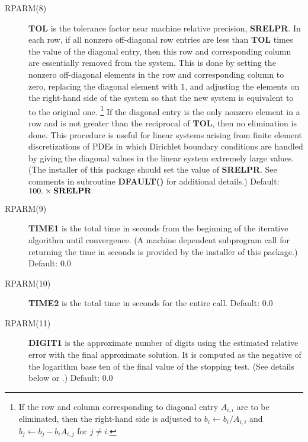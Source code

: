 \begin{description}
 \item[RPARM(8)] {\bf TOL} is the tolerance factor near machine relative 
                 precision, {\bf SRELPR}.  In each row, if all nonzero 
                 off-diagonal row entries are less than {\bf TOL} times 
                 the value of the diagonal entry, then this row and 
                 corresponding column are essentially removed from the 
                 system.  This is done by setting the nonzero off-diagonal 
                 elements in the row and corresponding column to zero, 
                 replacing the diagonal element with $1$, and adjusting 
                 the elements on the right-hand side of the system so that 
                 the new system is equivalent to to the original one.
                 \footnote{If the row and column corresponding to diagonal 
                 entry $A_{i,i}$ are to be eliminated, then the 
                 right-hand side is adjusted to $b_i \leftarrow b_i/A_{i,i}$ 
                 and $b_j \leftarrow b_j-b_i A_{i,j}$ for $j \neq i$.}  
                 If the diagonal entry is the only nonzero 
                 element in a row and is not greater than the reciprocal 
                 of {\bf TOL}, then no elimination is done.  This procedure 
                 is useful for linear systems arising from finite element 
                 discretizations of PDEs in which Dirichlet boundary 
                 conditions are handled by giving the diagonal values in 
                 the linear system extremely large values.  (The installer 
                 of this package should set the value of {\bf SRELPR}.
                 See comments in subroutine {\bf DFAULT()} for additional 
                 details.)  Default: $100.\times{\bf SRELPR}$
 
 \item[RPARM(9)] {\bf TIME1} is the total time in seconds from the beginning
                 of the iterative algorithm until convergence.  (A machine
                 dependent subprogram call for returning the time in
                 seconds is provided by the installer of this package.)
                 Default: $0.0$
 
 \item[RPARM(10)] {\bf TIME2} is the total time in seconds for the entire 
                  call.  Default: $0.0$
 
 \item[RPARM(11)] {\bf DIGIT1} is the approximate number of digits using 
                  the estimated relative error with the final approximate
                  solution.  It is computed as the negative of the logarithm
                  base ten of the final value of the stopping test.  (See
                  details below or \cite{6}.)  Default: $0.0$
 

\end{description}

